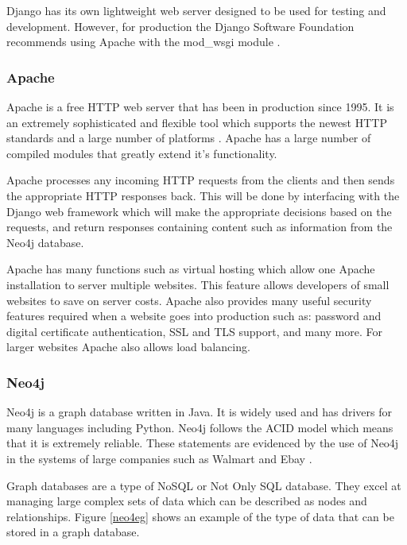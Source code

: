 \documentclass[12pt,onecolumn]{article}
\begin{document}
	Django has its own lightweight web server designed to be used for testing and development. However, for production the Django Software Foundation recommends using Apache with the mod\_wsgi module \cite{djangoApache}.
	\subsubsection{Apache}
	
	Apache is a free HTTP web server that has been in production since 1995. It is an extremely sophisticated and flexible tool which supports the newest HTTP standards and a large number of platforms \cite{apache}. Apache has a large number of compiled modules that greatly extend it's functionality. 
	
	
	Apache processes any incoming HTTP requests from the clients and then sends the appropriate HTTP responses back. This will be done by interfacing with the Django web framework which will make the appropriate decisions based on the requests, and return responses containing content such as information from the Neo4j database. 
	
	Apache has many functions such as virtual hosting which allow one Apache installation to server multiple websites. This feature allows developers of small websites to save on server costs. Apache also provides many useful security features required when a website goes into production such as: password and digital certificate authentication, SSL and TLS support, and many more. For larger websites Apache also allows load balancing. 
	
	\subsubsection{Neo4j}
	Neo4j is a graph database written in Java. It is widely used and has drivers for many languages including Python. Neo4j follows the ACID model which means that it is extremely reliable. These statements are evidenced by the use of Neo4j in the systems of large companies such as Walmart and Ebay \cite{neo4j}.  
	
	Graph databases are a type of NoSQL or Not Only SQL database. They excel at managing large complex sets of data which can be described as nodes and relationships. Figure \ref{neo4eg} shows an example of the type of data that can be stored in a graph database.
	
\end{document}
